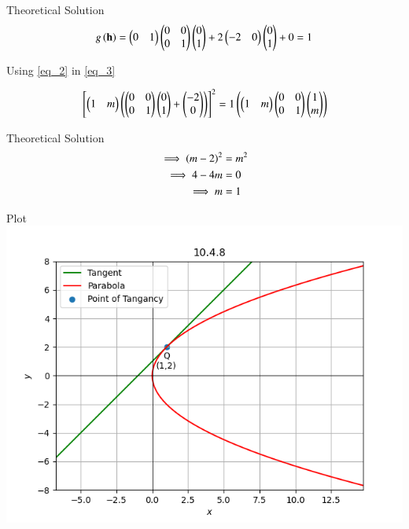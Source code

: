 \documentclass{beamer}
\begin{document}
\begin{frame}{Theoretical Solution}
\begin{align}
    g\left(\mathbf{h}\right) = \begin{pmatrix}0&1\end{pmatrix}\begin{pmatrix}0&0\\0&1\end{pmatrix}\begin{pmatrix}0\\1\end{pmatrix} + 2\begin{pmatrix}-2&0\end{pmatrix}\begin{pmatrix}0\\1\end{pmatrix} + 0 = 1 \label{eq_2}
\end{align}

Using \ref{eq_2} in \ref{eq_3}

\begin{align}
    {}\left[\begin{pmatrix}1 & m \end{pmatrix}\left(\begin{pmatrix}0&0\\0&1\end{pmatrix}\begin{pmatrix}0\\1\end{pmatrix} + \begin{pmatrix}-2\\0\end{pmatrix}\right)\right]^2 = 1\left(\begin{pmatrix}1&m\end{pmatrix}\begin{pmatrix}0&0\\0&1\end{pmatrix}\begin{pmatrix}1\\m\end{pmatrix}\right)
\end{align}
\end{frame}
\begin{frame}{Theoretical Solution}
\begin{align}
    \implies \left(m-2\right)^2 &= m^2 \\ 
    \implies 4 - 4m &=   0 \\ 
    \implies m &= 1
\end{align}
\end{frame}

 \begin{frame}{Plot}
    \centering
    \includegraphics[width=\columnwidth, height=0.8\textheight, keepaspectratio]{../figs/graph1.png}   
\end{frame}
\end{document}
